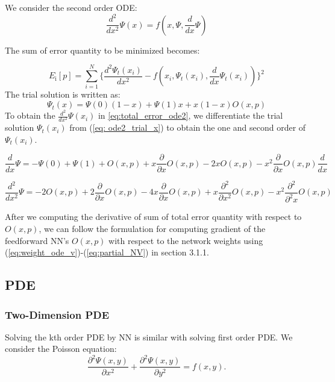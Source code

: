 \documentclass{article}
\begin{document}
\medspace \noindent
We consider the second order ODE:
\[\frac{d^2}{dx^2}\Psi(x)=f(x,\Psi,\frac{d}{dx}\Psi)\]

\medspace \noindent
The sum of error quantity to be minimized becomes:

\begin{equation}\label{eq:total_error_ode2}
E_\text{i}[p] =\sum_{i=1}^{N} \{ \frac{d^{2} \Psi_{t}(x_i)}{dx^2}-f(x_{i}, \Psi_{t}(x_i), \frac{d}{dx}\Psi_{t}(x_i)) \}^{2} 
\end{equation}
\medspace \noindent
The trial solution is written as:
\begin{equation}\label{eq: ode2_trial_x}
\Psi_t(x) = \Psi(0)(1-x)+ \Psi(1)x+x(1-x)O(x,p)
\end{equation}
\medspace \noindent
To obtain the $\frac{d^2}{dx^2}\Psi(x_i)$ in \ref{eq:total_error_ode2}, we differentiate the trial solution $\Psi_t(x_i)$ from (\ref{eq: ode2_trial_x}) to obtain the one and second order of $\Psi_{t}(x_i)$. 

\begin{equation} \label{eq:ode2_trial_dx}
\frac{d}{dx}\Psi = -\Psi(0) + \Psi(1) + O(x,p) +x\frac{\partial}{\partial x}O(x,p) - 2xO(x,p) - x^{2}\frac{\partial}{\partial x}O(x,p)
\frac{d}{dx}
\end{equation}

\begin{equation} \label{eq:ode2_trial_dxx}
\frac{d^{2}}{dx^{2}}\Psi  = -2O(x,p) + 2\frac{\partial }{\partial x}O(x,p) -4x\frac{\partial }{\partial x}O(x,p) + x\frac{\partial^{2}}{\partial x^{2}}O(x,p) - x^{2}\frac{\partial^{2} }{\partial^{2} x}O(x,p)
\end{equation}

After we computing the derivative of sum of total error quantity with respect to $O(x,p)$, we can follow the formulation for computing gradient of the feedforward NN's $O(x,p)$ with respect to the network weights using (\ref{eq:weight_ode_v})-(\ref{eq:partial_NV}) in section 3.1.1.

\subsection{PDE}

\subsubsection{Two-Dimension PDE}
Solving the kth order PDE by NN is similar with solving first order PDE.  We consider the Poisson equation: 
\begin{equation}
\frac{\partial^{2} \Psi (x,y)}{\partial x^2}+ \frac{\partial^{2} \Psi (x,y)}{\partial y^2} = f(x,y).
\end{equation}
\end{document}
